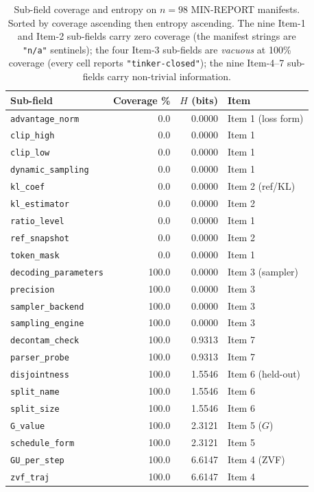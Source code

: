 \begin{table}[t]
\centering\small
\caption{Sub-field coverage and entropy on $n{=}98$ MIN-REPORT
manifests. Sorted by coverage ascending then entropy ascending. The
nine Item-1 and Item-2 sub-fields carry zero coverage (the manifest
strings are \texttt{"n/a"} sentinels); the four Item-3 sub-fields are
\emph{vacuous} at 100\% coverage (every cell reports \texttt{"tinker-closed"});
the nine Item-4--7 sub-fields carry non-trivial information.}
\label{tab:p5-subfield-coverage}
\begin{tabular}{@{}lrrl@{}}
\toprule
Sub-field & Coverage \% & $H$ (bits) & Item \\
\midrule
\texttt{advantage\_norm}        &    0.0 & 0.0000 & Item 1 (loss form) \\
\texttt{clip\_high}             &    0.0 & 0.0000 & Item 1 \\
\texttt{clip\_low}              &    0.0 & 0.0000 & Item 1 \\
\texttt{dynamic\_sampling}      &    0.0 & 0.0000 & Item 1 \\
\texttt{kl\_coef}               &    0.0 & 0.0000 & Item 2 (ref/KL) \\
\texttt{kl\_estimator}          &    0.0 & 0.0000 & Item 2 \\
\texttt{ratio\_level}           &    0.0 & 0.0000 & Item 1 \\
\texttt{ref\_snapshot}          &    0.0 & 0.0000 & Item 2 \\
\texttt{token\_mask}            &    0.0 & 0.0000 & Item 1 \\
\midrule
\texttt{decoding\_parameters}   &  100.0 & 0.0000 & Item 3 (sampler) \\
\texttt{precision}              &  100.0 & 0.0000 & Item 3 \\
\texttt{sampler\_backend}       &  100.0 & 0.0000 & Item 3 \\
\texttt{sampling\_engine}       &  100.0 & 0.0000 & Item 3 \\
\midrule
\texttt{decontam\_check}        &  100.0 & 0.9313 & Item 7 \\
\texttt{parser\_probe}          &  100.0 & 0.9313 & Item 7 \\
\texttt{disjointness}           &  100.0 & 1.5546 & Item 6 (held-out) \\
\texttt{split\_name}            &  100.0 & 1.5546 & Item 6 \\
\texttt{split\_size}            &  100.0 & 1.5546 & Item 6 \\
\texttt{G\_value}               &  100.0 & 2.3121 & Item 5 ($G$) \\
\texttt{schedule\_form}         &  100.0 & 2.3121 & Item 5 \\
\texttt{GU\_per\_step}           &  100.0 & 6.6147 & Item 4 (ZVF) \\
\texttt{zvf\_traj}              &  100.0 & 6.6147 & Item 4 \\
\bottomrule
\end{tabular}
\end{table}

